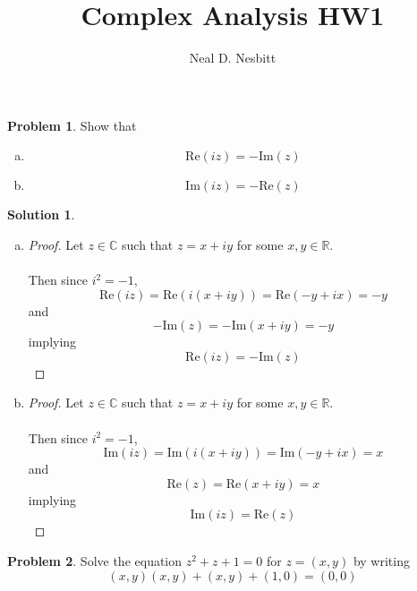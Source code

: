 \documentclass{article}
\title{Complex Analysis HW1\\}
\author{Neal D. Nesbitt}
\begin{document}
\maketitle

\theoremstyle{definition}
\newtheorem{problem}{Problem}
\newtheorem{solution}{Solution}[problem]
\renewcommand{\thesolution}{\theproblem}

\begin{problem}
Show that
\begin{enumerate}[(a)]
\item \[ \text{Re}(iz) = -\text{Im}(z) \]
\item \[ \text{Im}(iz) = -\text{Re}(z) \]
\end{enumerate}
\end{problem}


\begin{solution}
\begin{enumerate}[(a)]
\item
\begin{proof}
Let $z\in\mathbb{C}$ such that $z=x+iy$ for some $x,y\in\mathbb{R}$.

\paragraph{}
Then since $i^{2}=-1$,
\[ \text{Re}(iz) = \text{Re}(i(x+iy)) = \text{Re}(-y+ix) = -y \]
and
\[ -\text{Im}(z) = -\text{Im}(x+iy) = -y \]
implying
\[ \text{Re}(iz) = -\text{Im}(z) \]
\end{proof}
\item
\begin{proof}
Let $z\in\mathbb{C}$ such that $z=x+iy$ for some $x,y\in\mathbb{R}$.

\paragraph{}
Then since $i^{2}=-1$,
\[ \text{Im}(iz) = \text{Im}(i(x+iy)) = \text{Im}(-y+ix) = x \]
and
\[ \text{Re}(z) = \text{Re}(x+iy) = x \]
implying
\[ \text{Im}(iz) = \text{Re}(z) \]
\end{proof}
\end{enumerate}
\end{solution}

\begin{problem}
Solve the equation $z^{2}+z+1=0$ for $z=(x,y)$ by writing
\[ (x,y)(x,y) + (x,y) + (1,0) = (0,0) \]
\end{problem}
\end{document}
